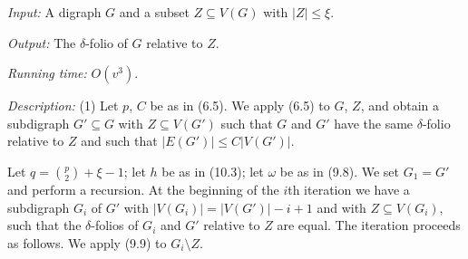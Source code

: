 \textit{Input:} A digraph $G$ and a subset $Z \subseteq V(G)$ with $|Z| \le \xi$.

\textit{Output:} The $\delta$-folio of $G$ relative to $Z$.

\textit{Running time:} $O(v^3)$.

\textit{Description:} (1) Let $p$, $C$ be as in (6.5). We apply (6.5) to $G$, $Z$, and obtain a subdigraph $G' \subseteq G$ with $Z \subseteq V(G')$ such that $G$ and $G'$ have the same $\delta$-folio relative to $Z$ and such that $|E(G')| \le C|V(G')|$.

Let $q = \binom{p}{2} + \xi - 1$; let $h$ be as in (10.3); let $\omega$ be as in (9.8). We set $G_1 = G'$ and perform a recursion. At the beginning of the $i$th iteration we have a subdigraph $G_i$ of $G'$ with $|V(G_i)| = |V(G')| - i + 1$ and with $Z \subseteq V(G_i)$, such that the $\delta$-folios of $G_i$ and $G'$ relative to $Z$ are equal. The iteration proceeds as follows. We apply (9.9) to $G_i \setminus Z$.
